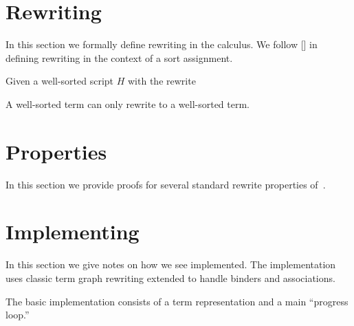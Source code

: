 \documentclass[letterpaper,11pt]{article}
\begin{document}

\section{Rewriting}
\label{sec:rewriting}

In this section we formally define rewriting in the \hax calculus. We follow [] in
defining rewriting in the context of a sort assignment.

\begin{definition}[substitution]
  
\end{definition}


\begin{theorem}
  Given a well-sorted \hax script $H$ with the rewrite 


A well-sorted term can only rewrite to a well-sorted term.
\end{theorem}


\section{Properties}
\label{sec:properties}

In this section we provide proofs for several standard rewrite properties of~\hax.




\section{Implementing \hax}
\label{sec:implement}

In this section we give notes on how we see \hax implemented. The implementation uses classic term
graph rewriting extended to handle binders and associations.

The basic \hax implementation consists of a term representation and a main ``progress loop.''
\end{document}
